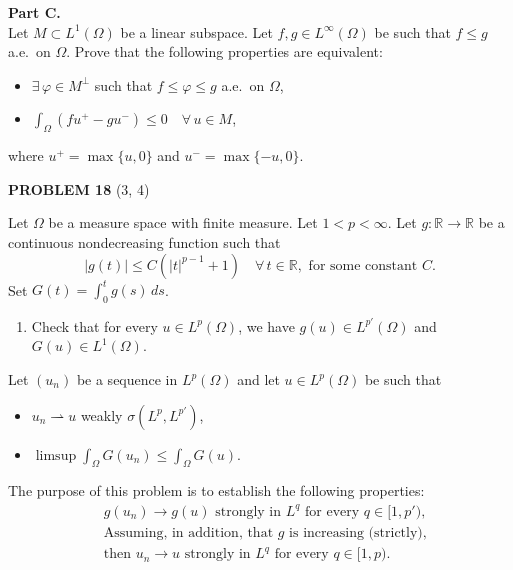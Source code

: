 \documentclass[12pt]{article}
\newcommand{\abs}[1]{\left|#1\right|}
\newcommand{\R}{\mathbb{R}}
\begin{document}
\noindent\textbf{Part C.}\\
Let $M \subset L^1(\Omega)$ be a linear subspace. Let $f, g \in L^\infty(\Omega)$ be such that $f \le g$ a.e.\
on $\Omega$. Prove that the following properties are equivalent:
\begin{itemize}
\item[(i)] $\exists\, \varphi \in M^\perp$ such that $f \le \varphi \le g$ a.e.\ on $\Omega$,
\item[(ii)] $\displaystyle\int_\Omega (f u^+ - g u^-) \le 0 \quad \forall\, u \in M$,
\end{itemize}
where $u^+ = \max\{u, 0\}$ and $u^- = \max\{-u, 0\}$.
 
\noindent[\textit{Hint:} Assuming (ii), check that $\int_\Omega(g+f)u \le \int_\Omega(g-f)\abs{u}$ $\forall\, u \in M$ and apply
Theorem 1.12 to find some $\psi \in L^\infty(\Omega)$ with $\abs{\psi} \le g - f$, such that
$\psi - (g+f) \in M^\perp$. Take $\varphi = \tfrac{1}{2}(g + f - \psi)$.]
 
\bigskip
 
\noindent\textbf{PROBLEM 18} (3, 4)
 
\medskip
 
Let $\Omega$ be a measure space with finite measure. Let $1 < p < \infty$. Let $g : \R \to \R$
be a continuous nondecreasing function such that
\[
\abs{g(t)} \le C(\abs{t}^{p-1} + 1) \quad \forall\, t \in \R, \text{ for some constant } C.
\]
Set $G(t) = \int_0^t g(s)\,ds$.
 
\begin{enumerate}
\item Check that for every $u \in L^p(\Omega)$, we have $g(u) \in L^{p'}(\Omega)$ and $G(u) \in L^1(\Omega)$.
\end{enumerate}
 
\noindent Let $(u_n)$ be a sequence in $L^p(\Omega)$ and let $u \in L^p(\Omega)$ be such that
\begin{itemize}
\item[(i)] $u_n \rightharpoonup u$ weakly $\sigma(L^p, L^{p'})$,
\item[(ii)] $\displaystyle\limsup \int_\Omega G(u_n) \le \int_\Omega G(u)$.
\end{itemize}
The purpose of this problem is to establish the following properties:
\begin{align*}
&g(u_n) \to g(u) \text{ strongly in } L^q \text{ for every } q \in [1, p'), \tag{1}\\
&\text{Assuming, in addition, that } g \text{ is increasing (strictly),}\\
&\text{then } u_n \to u \text{ strongly in } L^q \text{ for every } q \in [1, p). \tag{2}
\end{align*}
 
\end{document}
